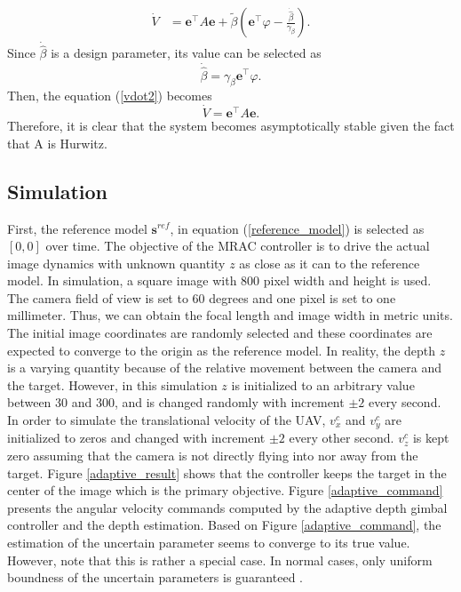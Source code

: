 \begin{align}
\dot{V}&=\mathbf{e}^\top A\mathbf{e}+\tilde{\beta}(\mathbf{e}^\top\varphi-\frac{\dot{\hat{\beta}}}{\gamma_\beta}).
\end{align}
Since $\dot{\hat{\beta}}$ is a design parameter, its value can be selected as 
\begin{equation}
\dot{\hat{\beta}}=\gamma_\beta\mathbf{e}^\top\varphi.
\end{equation}
Then, the equation (\ref{vdot2}) becomes
\begin{equation}
\dot{V}=\mathbf{e}^\top A\mathbf{e}.
\end{equation}
Therefore, it is clear that the system becomes asymptotically stable given the fact that A is Hurwitz.
\subsection{Simulation}
First, the reference model $\mathbf{s}^{ref}$, in equation (\ref{reference_model}) is selected as $[0, 0]$ over time. The objective of the MRAC controller is to drive the actual image dynamics with unknown quantity $z$ as close as it can to the reference model. In simulation, a square image with 800 pixel width and height is used. The camera field of view is set to 60 degrees and one pixel is set to one millimeter. Thus, we can obtain the focal length and image width in metric units. The initial image coordinates are randomly selected and these coordinates are expected to converge to the origin as the reference model. In reality, the depth $z$ is a varying quantity because of the relative movement between the camera and the target. However, in this simulation $z$ is initialized to an arbitrary value between 30 and 300, and is changed randomly with increment $\pm2$ every second. In order to simulate the translational velocity of the UAV, $v_x^c$ and $v_y^c$ are initialized to zeros and changed with increment $\pm2$ every other second. $v_z^c$ is kept zero assuming that the camera is not directly flying into nor away from the target. Figure \ref{adaptive_result} shows that the controller keeps the target in the center of the image which is the primary objective. Figure \ref{adaptive_command} presents the angular velocity commands computed by the adaptive depth gimbal controller and the depth estimation. Based on Figure \ref{adaptive_command}, the estimation of the uncertain parameter seems to converge to its true value. However, note that this is rather a special case. In normal cases, only uniform boundness of the uncertain parameters is guaranteed \cite{Lavretsky2013}. 
